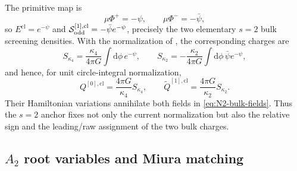 \documentclass[11pt,a4paper]{article}
\numberwithin{equation}{section}
\theoremstyle{remark}
\newcommand{\cl}{\mathrm{cl}}
\newcommand{\dd}{\mathrm{d}}
\newcommand{\cS}{\mathcal S}
\begin{document}
The primitive map is
\begin{equation}
 \mu\Phi^+=-\psi,\qquad \mu\Phi^-=-\bar\psi,
 \label{eq:N2-primitives}
\end{equation}
so $E^{\cl}=e^{-\psi}$ and
$\cS_{\rm odd}^{[1],\cl}=-\bar\psi e^{-\psi}$, precisely the two elementary $s=2$ bulk
screening densities.
With the normalization of \cite{DArcyDelfanteFredenhagen}, the corresponding charges are
\begin{equation}
 S_{\kappa_4}=\frac{\kappa_4}{4\pi G}\int\dd\phi\,e^{-\psi},\qquad
 S_{\kappa_2}=-\frac{\kappa_2}{4\pi G}\int\dd\phi\,
 \bar\psi e^{-\psi},
 \label{eq:N2-bulk-screenings}
\end{equation}
and hence, for unit circle-integral normalization,
\begin{equation}
 Q^{[0],\cl}=\frac{4\pi G}{\kappa_4}S_{\kappa_4},\qquad
 \widetilde Q^{[1],\cl}=\frac{4\pi G}{\kappa_2}S_{\kappa_2}.
 \label{eq:N2-charge-map}
\end{equation}
Their Hamiltonian variations annihilate both fields in \cref{eq:N2-bulk-fields}.  Thus the
$s=2$ anchor fixes not only the current normalization but also the relative sign and the
leading/raw assignment of the two bulk charges.

\subsection{\texorpdfstring{$A_2$}{A2} root variables and Miura matching}
\end{document}
